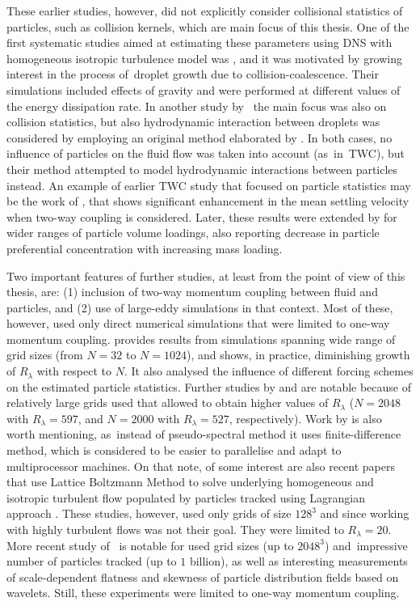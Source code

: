 \documentclass{pracamgren}
\begin{document}
These earlier studies, however, did not explicitly consider collisional statistics of particles, such as collision kernels, which are main focus of this thesis.
One of the first systematic studies aimed at estimating these parameters using DNS with homogeneous isotropic turbulence model was \textcite{Ayala2008}, and it was motivated by growing interest in the process of~droplet growth due to collision-coalescence.
Their simulations included effects of gravity and were performed at different values of the energy dissipation rate.
In another study by~\textcite{Wang2008} the main focus was also on collision statistics, but also hydrodynamic interaction between droplets was considered by employing an original method elaborated by \textcite{Ayala2007}.
In both cases, no influence of particles on the fluid flow was taken into account (as~in~TWC), but their method attempted to model hydrodynamic interactions between particles instead.
An example of earlier TWC study that focused on  particle statistics may be the work of \textcite{Bosse2006}, that shows significant enhancement in the mean settling velocity when two-way coupling is considered. 
Later, these results were extended by \textcite{Monchaux2017} for wider ranges of particle volume loadings, also reporting decrease in particle preferential concentration with increasing mass loading.

Two important features of further studies, at least from the point of view of this thesis, are: (1) inclusion of two-way momentum coupling between fluid and particles, and (2) use of large-eddy simulations in that context.
Most of these, however, used only direct numerical simulations that were limited to one-way momentum coupling.
\textcite{Rosa2013} provides results from simulations spanning wide range of grid sizes (from $N=32$ to $N=1024$), and shows, in practice, diminishing growth of $R_{\lambda}$ with respect to $N$.
It also analysed the influence of different forcing schemes on the estimated particle statistics.
Further studies by \textcite{Onishi2013} and \textcite{Ireland2016} are notable because of relatively large grids used that allowed to obtain higher values of $R_{\lambda}$ ($N=2048$ with $R_{\lambda}=597$, and $N=2000$ with $R_{\lambda} = 527$, respectively).
Work by \textcite{Onishi2013} is also worth mentioning, as~instead of pseudo-spectral method it uses finite-difference method, which is considered to be easier to parallelise and adapt to multiprocessor machines.
On that note, of some interest are also recent papers that use Lattice Boltzmann Method to solve underlying homogeneous and isotropic turbulent flow populated by particles tracked using Lagrangian approach \parencite{Ernst2019,Lain2020}.
These studies, however, used only grids of size $128^3$ and since working with highly turbulent flows was not their goal.
They were limited to $R_{\lambda} = 20$.
More recent study of~\textcite{Matsuda2021} is notable for used grid sizes (up to $2048^3$) and~impressive number of particles tracked (up to $1$ billion), as well as interesting measurements of scale-dependent flatness and skewness of particle distribution fields based on wavelets.
Still, these experiments were limited to one-way momentum coupling.
\end{document}
